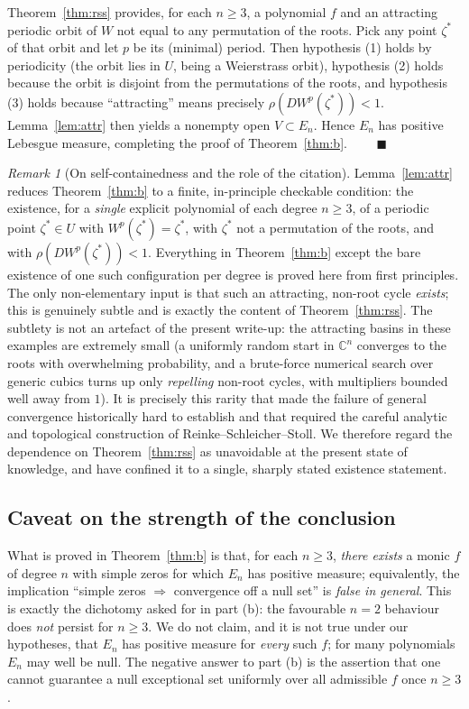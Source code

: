 \documentclass{amsart}
\theoremstyle{definition}
\theoremstyle{remark}
\newtheorem{remark}{Remark}
\newcommand{\C}{\mathbb{C}}
\begin{document}
Theorem~\ref{thm:rss} provides, for each $n\ge3$, a polynomial $f$ and an attracting periodic
orbit of $W$ not equal to any permutation of the roots. Pick any point $\zeta^{*}$ of that
orbit and let $p$ be its (minimal) period. Then hypothesis (1) holds by periodicity (the
orbit lies in $U$, being a Weierstrass orbit), hypothesis (2) holds because the orbit is
disjoint from the permutations of the roots, and hypothesis (3) holds because
``attracting'' means precisely $\rho(DW^{p}(\zeta^{*}))<1$. Lemma~\ref{lem:attr} then yields
a nonempty open $V\subset E_n$. Hence $E_n$ has positive Lebesgue measure, completing the
proof of Theorem~\ref{thm:b}. $\qquad\blacksquare$

\begin{remark}[On self-containedness and the role of the citation]
Lemma~\ref{lem:attr} reduces Theorem~\ref{thm:b} to a finite, in-principle checkable
condition: the existence, for a \emph{single} explicit polynomial of each degree
$n\ge3$, of a periodic point $\zeta^{*}\in U$ with $W^p(\zeta^*)=\zeta^*$, with $\zeta^*$ not
a permutation of the roots, and with $\rho(DW^{p}(\zeta^{*}))<1$. Everything in
Theorem~\ref{thm:b} except the bare existence of one such configuration per degree is proved
here from first principles. The only non-elementary input is that such an attracting,
non-root cycle \emph{exists}; this is genuinely subtle and is exactly the content of
Theorem~\ref{thm:rss}. The subtlety is not an artefact of the present write-up: the attracting
basins in these examples are extremely small (a uniformly random start in $\C^n$ converges to
the roots with overwhelming probability, and a brute-force numerical search over generic
cubics turns up only \emph{repelling} non-root cycles, with multipliers bounded well away from
$1$). It is precisely this rarity that made the failure of general convergence historically
hard to establish and that required the careful analytic and topological construction of
Reinke--Schleicher--Stoll. We therefore regard the dependence on Theorem~\ref{thm:rss} as
unavoidable at the present state of knowledge, and have confined it to a single, sharply
stated existence statement.
\end{remark}

\subsection{Caveat on the strength of the conclusion}

What is proved in Theorem~\ref{thm:b} is that, for each $n\ge3$, \emph{there exists} a monic
$f$ of degree $n$ with simple zeros for which $E_n$ has positive measure; equivalently, the
implication ``simple zeros $\Rightarrow$ convergence off a null set'' is \emph{false in
general}. This is exactly the dichotomy asked for in part (b): the favourable $n=2$ behaviour
does \emph{not} persist for $n\ge3$. We do not claim, and it is not true under our hypotheses,
that $E_n$ has positive measure for \emph{every} such $f$; for many polynomials $E_n$ may well
be null. The negative answer to part (b) is the assertion that one cannot guarantee a null
exceptional set uniformly over all admissible $f$ once $n\ge3$.
\end{document}
